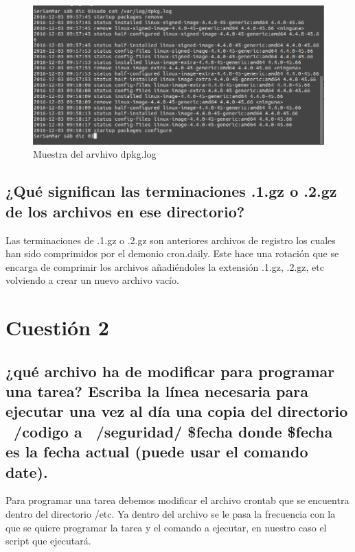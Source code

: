 \begin{figure}[H] %
	\centering
	\includegraphics[scale=0.5]{imagenes/dpkg-log.png}  %
	\caption{Muestra del arvhivo dpkg.log}
\end{figure}


\subsection{\Large ¿Qué significan las terminaciones .1.gz o .2.gz de los archivos en ese directorio?}

Las terminaciones de .1.gz o .2.gz son anteriores archivos de registro los cuales han sido comprimidos por el demonio cron.daily.
Este hace una rotación que se encarga de comprimir los archivos añadiéndoles la extensión .1.gz, .2.gz, etc volviendo a crear un nuevo archivo vacío.
\cite{1-gz}

\section{Cuestión 2}

\subsection{\Large ¿qué archivo ha de modificar para programar una tarea? Escriba la línea necesaria para ejecutar una vez al día una copia del directorio ~/codigo a ~/seguridad/ \$fecha donde \$fecha es la fecha actual (puede usar el comando date).}

Para programar una tarea debemos modificar el archivo crontab que se encuentra dentro del directorio /etc.
Ya dentro del archivo se le pasa la frecuencia con la que se quiere programar la tarea y el comando a ejecutar, en nuestro caso el script que ejecutará.\cite{cron} \cite{crontab}

